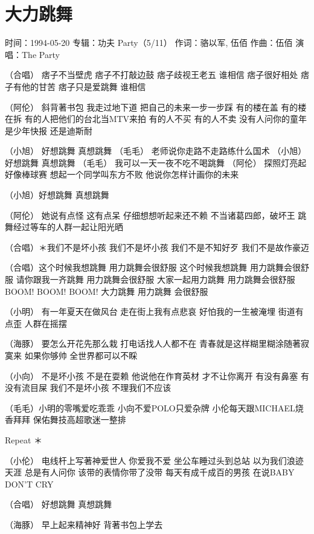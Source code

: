 \documentclass[UTF8,a4paper,oneside,twocolumn,12pt]{ctexbook}
\newcommand{\infopair}[2]{\textbullet #1：#2}
\newcommand{\zc}[1][伍佰]{\infopair{作词}{#1}}
\newcommand{\zq}[1][伍佰]{\infopair{作曲}{#1}}
\newcommand{\zj}[1]{\infopair{专辑}{#1}}
\newcommand{\sj}[1]{\infopair{时间}{#1}}
\newenvironment{info}{\begin{flushleft}\kaishu
	}
	{\end{flushleft}\normalsize\yahei\par}
\newenvironment{lyric}{
	}
{}
\begin{document}
\section{大力跳舞}
\begin{info}
	\sj{1994-05-20}
	\zj{功夫 Party（5/11）}
	\zc[骆以军, 伍佰]
	\zq
	\infopair{演唱}{The Party}
\end{info}
\begin{lyric}
	（合唱）
	痞子不当壁虎 痞子不打敲边鼓
	痞子歧视王老五 谁相信
	痞子很好相处 痞子有他的甘苦
	痞子只是爱跳舞 谁相信

	（阿伦）
	斜背著书包 我走过地下道 把自己的未来一步一步踩
	有的楼在盖 有的楼在拆 有的人把他们的台北当MTV来拍
	有的人不买 有的人不卖 没有人问你的童年是少年快报
	还是迪斯耐

	（小旭） 好想跳舞 真想跳舞
	（毛毛） 老师说你走路不走路练什么国术
	（小旭） 好想跳舞 真想跳舞
	（毛毛） 我可以一天一夜不吃不喝跳舞
	（阿伦） 探照灯亮起 好像棒球赛 想起一个同学叫东方不败
	他说你怎样计画你的未来

	（小旭）好想跳舞 真想跳舞

	（阿伦）
	她说有点怪 这有点呆
	仔细想想听起来还不赖
	不当诸葛四郎，破坏王
	跳舞经过等车的人群一起让阳光晒

	（合唱）＊我们不是坏小孩 我们不是坏小孩
	我们不是不知好歹 我们不是故作豪迈

	（合唱）这个时候我想跳舞 用力跳舞会很舒服
	这个时候我想跳舞 用力跳舞会很舒服
	请你跟我一齐跳舞 用力跳舞会很舒服
	大家一起用力跳舞 用力跳舞会很舒服
	BOOM! BOOM! BOOM! 大力跳舞
	用力跳舞 会很舒服

	（小明）
	有一年夏天在做风台 走在街上我有点悲哀
	好怕我的一生被淹埋 街道有点歪 人群在摇摆

	（海豚）
	要怎么开花先那么栽 打电话找人人都不在
	青春就是这样糊里糊涂随著寂寞来 如果你够帅
	全世界都可以不睬

	（小向）
	不是坏小孩 不是在耍赖 他说他在作育英材
	才不让你离开
	有没有鼻塞 有没有流目屎 我们不是坏小孩
	不理我们不应该

	（毛毛）小明的零嘴爱吃乖乖 小向不爱POLO只爱杂牌
	小伦每天跟MICHAEL烧香拜拜
	保佑舞技高超歌迷一整排

	Repeat ＊

	（小伦）
	电线杆上写著神爱世人 你爱我不爱
	坐公车睡过头到总站 以为我们浪迹天涯
	总是有人问你 该带的表情你带了没带
	每天有成千成百的男孩 在说BABY DON'T CRY

	（合唱） 好想跳舞 真想跳舞

	（海豚）
	早上起来精神好 背著书包上学去
\end{lyric}
\end{document}
